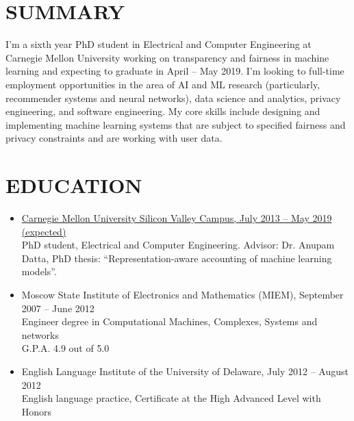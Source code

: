 \documentclass{res}
\begin{document}
 


\address{Phone: (302) 415-4176\\Email, Google Hangouts: \href{mailto:sophia.m.kovaleva@gmail.com}{sophia.m.kovaleva@gmail.com}}


\begin{resume}

\section{SUMMARY}

I'm a sixth year PhD student in Electrical and Computer Engineering at Carnegie Mellon University working on transparency and fairness in machine learning and expecting to graduate in April -- May 2019.
I'm looking to full-time employment opportunities in the area of AI and ML research (particularly, recommender systems and neural networks), data science and analytics, privacy engineering, and software engineering. 
My core skills include designing and implementing machine learning systems that are subject to specified fairness and privacy constraints and are working with user data.


\section{EDUCATION}
\begin{itemize}
	\item
		\underline{Carnegie Mellon University Silicon Valley Campus, July 2013 -- May 2019 (expected)}\\
		PhD student, Electrical and Computer Engineering. Advisor: Dr. Anupam Datta, PhD thesis: ``Representation-aware accounting of machine learning models''.
	\item
		Moscow State Institute of Electronics and Mathematics (MIEM), September 2007 -- June 2012\\
		Engineer degree in Computational Machines, Complexes, Systems and networks\\
		G.P.A. 4.9 out of 5.0
	\item
		English Language Institute of the University of Delaware, July 2012 -- August 2012\\
		English language practice, Certificate at the High Advanced Level with Honors
\end{itemize}


\end{resume}
\end{document}
